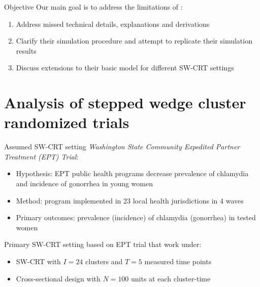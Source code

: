 \documentclass[9pt]{beamer}
\begin{document}
\begin{frame}{Objective}
Our main goal is to address the limitations of \citet{Hussey:2007}:
\vspace{1.5em}

\begin{enumerate}
\setlength\itemsep{1.5em}

\item
Address missed technical details, explanations and derivations

\item
Clarify their simulation procedure and attempt to replicate their simulation results

\item
Discuss extensions to their basic model for different SW-CRT settings

\end{enumerate}

\end{frame}



\section{Analysis of stepped wedge cluster randomized trials}



\begin{frame}{Assumed SW-CRT setting}
\textit{Washington State Community Expedited Partner Treatment (EPT) Trial}:
\begin{itemize}

\item
Hypothesis: EPT public health programs decrease prevalence of chlamydia and incidence of gonorrhea in young women

\item
Method: program implemented in 23 local health jurisdictions in 4 waves

\item
Primary outcomes: prevalence (incidence) of chlamydia (gonorrhea) in tested women
\end{itemize}
\vspace{2em}

Primary SW-CRT setting based on EPT trial that \citet{Hussey:2007} work under:
\begin{itemize}

\item
SW-CRT with $I=24$ clusters and $T=5$ measured time points

\item
Cross-sectional design with $N=100$ units at each cluster-time

\end{itemize}
\end{frame}
\end{document}
